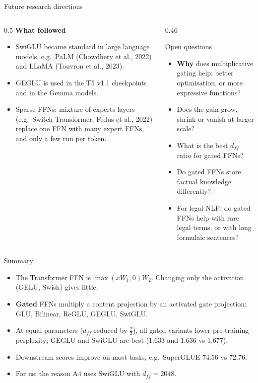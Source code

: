 \documentclass[aspectratio=169,11pt]{beamer}
\begin{document}
\begin{frame}{Future research directions}
  \begin{columns}[T]
    \begin{column}{0.5\textwidth}
      \small
      \textbf{What followed}
      \begin{itemize}
        \item SwiGLU became standard in large language models, e.g.\ PaLM (Chowdhery et al., 2022) and LLaMA (Touvron et al., 2023).
        \item GEGLU is used in the T5 v1.1 checkpoints and in the Gemma models.
        \item Sparse FFNs: mixture-of-experts layers (e.g.\ Switch Transformer, Fedus et al., 2022) replace one FFN with many expert FFNs, and only a few run per token.
      \end{itemize}
    \end{column}
    \begin{column}{0.46\textwidth}
      \begin{block}{Open questions}
        \small
        \begin{itemize}
          \item \textbf{Why} does multiplicative gating help: better optimisation, or more expressive functions?
          \item Does the gain grow, shrink or vanish at larger scale?
          \item What is the best $d_{ff}$ ratio for gated FFNs?
          \item Do gated FFNs store factual knowledge differently?
          \item For legal NLP: do gated FFNs help with rare legal terms, or with long formulaic sentences?
        \end{itemize}
      \end{block}
    \end{column}
  \end{columns}
\end{frame}

\begin{frame}{Summary}
  \begin{itemize}
    \item The Transformer FFN is $\max(xW_1,0)W_2$. Changing only the activation (GELU, Swish) gives little.
    \item \textbf{Gated} FFNs multiply a content projection by an activated gate projection: GLU, Bilinear, ReGLU, GEGLU, SwiGLU.
    \item At equal parameters ($d_{ff}$ reduced by $\tfrac23$), all gated variants lower pre-training perplexity; GEGLU and SwiGLU are best (1.633 and 1.636 vs 1.677).
    \item Downstream scores improve on most tasks, e.g.\ SuperGLUE 74.56 vs 72.76.
    \item For us: the reason A4 uses SwiGLU with $d_{ff}=2048$.
  \end{itemize}
\end{frame}
\end{document}
